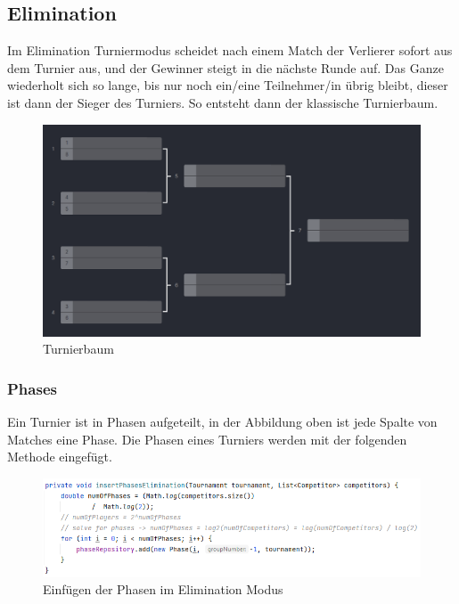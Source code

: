 \subsection{Elimination}

Im Elimination Turniermodus scheidet nach einem Match der Verlierer sofort aus dem Turnier aus, und der Gewinner steigt in die nächste Runde auf. 
Das Ganze wiederholt sich so lange, bis nur noch ein/eine Teilnehmer/in übrig bleibt, dieser ist dann der Sieger des Turniers. So entsteht dann der klassische Turnierbaum.

\begin{figure}[H]
    \includegraphics[scale=0.5]{pics/backend/elimination/elimination_tree.png}
    \caption{Turnierbaum\cite{implementation-execution-1}}
\end{figure}

\subsubsection{Phases}

Ein Turnier ist in Phasen aufgeteilt, in der Abbildung oben ist jede Spalte von Matches eine Phase. Die Phasen eines Turniers werden mit der folgenden Methode eingefügt.

\begin{figure}[H]
    \includegraphics[scale=0.7]{pics/backend/elimination/elimination_insertPhases.png}
    \caption{Einfügen der Phasen im Elimination Modus}
\end{figure}

